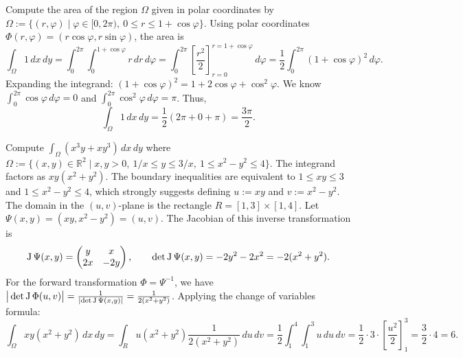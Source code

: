 \begin{example}
\label{ex:area_cardioid}
Compute the area of the region $\Omega$ given in polar coordinates by $\Omega := \{(r,\varphi) \mid \varphi \in [0, 2\pi),\ 0 \leq r \leq 1 + \cos\varphi\}$.
Using polar coordinates $\Phi(r,\varphi) = (r\cos\varphi, r\sin\varphi)$, the area is
\[\int_\Omega 1 \,dx\,dy = \int_0^{2\pi} \int_0^{1+\cos\varphi} r \,dr\,d\varphi = \int_0^{2\pi} \left[ \frac{r^2}{2} \right]_{r=0}^{r=1+\cos\varphi} \,d\varphi = \frac{1}{2} \int_0^{2\pi} (1+\cos\varphi)^2 \,d\varphi.\]
Expanding the integrand: $(1+\cos\varphi)^2 = 1 + 2\cos\varphi + \cos^2\varphi$. We know $\int_0^{2\pi} \cos\varphi \,d\varphi = 0$ and $\int_0^{2\pi} \cos^2\varphi \,d\varphi = \pi$. Thus,
\[\int_\Omega 1 \,dx\,dy = \frac{1}{2} (2\pi + 0 + \pi) = \frac{3\pi}{2}.\]
\end{example}

\begin{example}
\label{ex:substitution_and_fubini_rational}
Compute $\int_\Omega (x^3 y + x y^3) \,dx\,dy$ where $\Omega := \{(x,y) \in \mathbb{R}^2 \mid x,y > 0,\ 1/x \le y \le 3/x,\ 1 \le x^2 - y^2 \le 4\}$.
The integrand factors as $xy(x^2+y^2)$. The boundary inequalities are equivalent to $1 \le xy \le 3$ and $1 \le x^2-y^2 \le 4$, which strongly suggests defining $u := xy$ and $v := x^2 - y^2$.
The domain in the $(u,v)$-plane is the rectangle $R = [1,3] \times [1,4]$.
Let $\Psi(x,y) = (xy, x^2-y^2) = (u,v)$. The Jacobian of this inverse transformation is
\[\operatorname{J}\Psi(x,y) = \begin{pmatrix} y & x \\ 2x & -2y \end{pmatrix}, \qquad \det\operatorname{J}\Psi(x,y) = -2y^2 - 2x^2 = -2(x^2+y^2).\]
For the forward transformation $\Phi = \Psi^{-1}$, we have $\big|\det\operatorname{J}\Phi(u,v)\big| = \frac{1}{\lvert\det\operatorname{J}\Psi(x,y)\rvert} = \frac{1}{2(x^2+y^2)}$.
Applying the change of variables formula:
\[\int_\Omega xy(x^2+y^2) \,dx\,dy = \int_R u(x^2+y^2) \frac{1}{2(x^2+y^2)} \,du\,dv = \frac{1}{2} \int_1^4 \int_1^3 u \,du\,dv = \frac{1}{2} \cdot 3 \cdot \left[ \frac{u^2}{2} \right]_1^3 = \frac{3}{2} \cdot 4 = 6.\]
\end{example}




